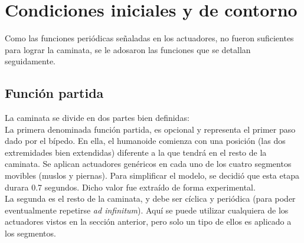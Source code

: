 \documentclass{article}
\begin{document}

\section{Condiciones iniciales y de contorno}
Como las funciones peri\'odicas se\~naladas en los actuadores, no fueron suficientes para lograr la caminata, se le adosaron las funciones que se detallan seguidamente. 
\subsection{Funci\'on partida}
La caminata se divide en dos partes bien definidas:\\
La primera denominada funci\'on partida, es opcional y representa el primer paso dado por el b\'ipedo. En ella, el humanoide comienza con una posici\'on (las dos extremidades bien extendidas) diferente a la que tendr\'a en el resto de la caminata. Se aplican actuadores gen\'ericos en cada uno de los cuatro segmentos movibles (muslos y piernas). Para simplificar el modelo, se decidi\'o que esta etapa durara 0.7 segundos. Dicho valor fue extra\'ido de forma experimental. \\
La segunda es el resto de la caminata, y debe ser c\'iclica y peri\'odica (para poder eventualmente repetirse \textit{ad infinitum}). Aqu\'i se puede utilizar cualquiera de los actuadores vistos en la secci\'on anterior, pero solo un tipo de ellos es aplicado a los segmentos. 
\\
\end{document}
